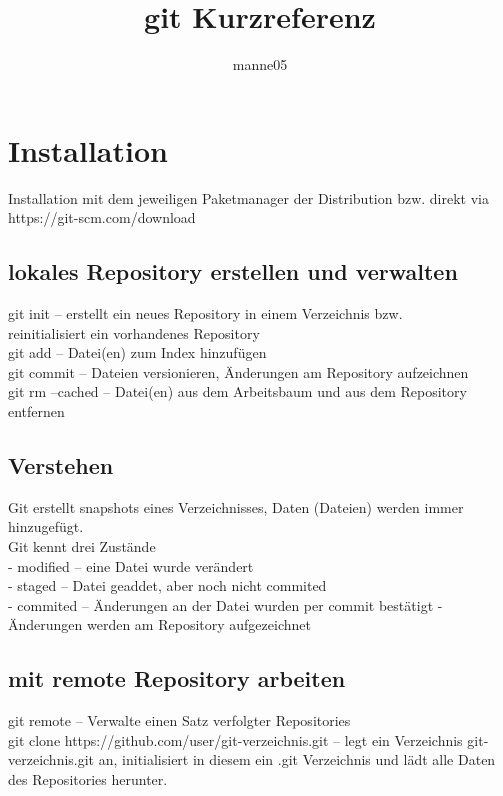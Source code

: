 \documentclass[11pt, oneside]{article}   	%
\title{git Kurzreferenz}
\author{manne05}
\date{}							%
\begin{document}
\maketitle
\section{Installation}
Installation mit dem jeweiligen Paketmanager der Distribution bzw. direkt via https://git-scm.com/download
\subsection{lokales Repository erstellen und verwalten}
git init         -- erstellt ein neues Repository in einem Verzeichnis bzw. \\
                    reinitialisiert ein vorhandenes Repository  \\
git add          -- Datei(en) zum Index hinzufügen \\
git commit       -- Dateien versionieren, Änderungen am Repository aufzeichnen \\
git rm --cached  -- Datei(en) aus dem Arbeitsbaum und aus dem Repository entfernen \\

\subsection{Verstehen}
Git erstellt snapshots eines Verzeichnisses, Daten (Dateien) werden immer hinzugefügt. \\
Git kennt drei Zustände \\
- modified -- eine Datei wurde verändert\\
- staged    -- Datei geaddet, aber noch nicht commited \\
- commited -- Änderungen an der Datei wurden per commit bestätigt - Änderungen werden am Repository aufgezeichnet

\subsection{mit remote Repository arbeiten}
git remote -- Verwalte einen Satz verfolgter Repositories\\
git clone https://github.com/user/git-verzeichnis.git   -- legt ein Verzeichnis git-verzeichnis.git an, initialisiert in diesem ein .git Verzeichnis und lädt alle Daten des Repositories herunter.
\end{document}
